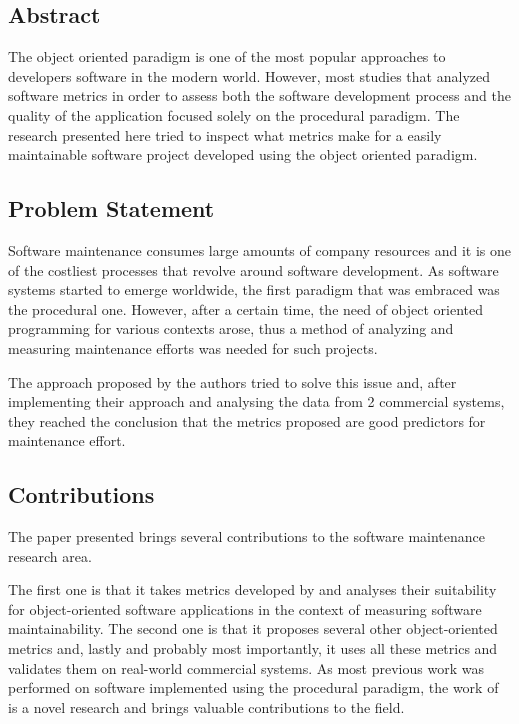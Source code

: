 \documentclass[a4paper,12pt]{article}
\begin{document}
\subsection{Abstract}

The object oriented paradigm is one of the most popular approaches to developers
software in the modern world. However, most studies that analyzed software 
metrics in order to assess both the software development process and the
quality of the application focused solely on the procedural paradigm. 
The research presented here tried to inspect what metrics make for a easily
maintainable software project developed using the object oriented paradigm.

\subsection{Problem Statement}

Software maintenance consumes large amounts of company resources and it is
one of the costliest processes that revolve around software development.
As software systems started to emerge worldwide, the first paradigm that
was embraced was the procedural one. However, after a certain time, the need
of object oriented programming for various contexts arose, thus a method of
analyzing and measuring maintenance efforts was needed for such projects.

The approach proposed by the authors tried to solve this issue and, after 
implementing their approach and analysing the data from 2 commercial systems,
they reached the conclusion that the metrics proposed are good predictors
for maintenance effort.

\subsection{Contributions}

The paper presented brings several contributions to the software maintenance
research area. 

The first one is that it takes metrics developed by \citet{chidamber1994metrics} 
and analyses their suitability for object-oriented software applications in the 
context of measuring software maintainability. The second one is that it proposes 
several other object-oriented metrics and, lastly and probably most importantly, it 
uses all these metrics and validates them on real-world commercial systems. 
As most previous work was performed on software implemented using
the procedural paradigm, the work of \citet{li1993maintenance} is a novel research
and brings valuable contributions to the field.
\end{document}
